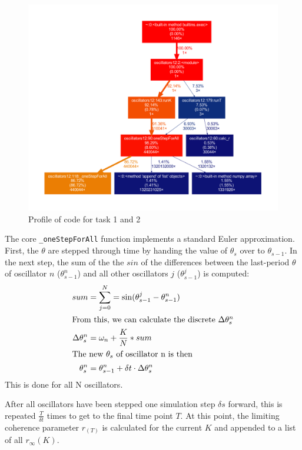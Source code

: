 \documentclass[11pt,a4paper]{article}
\newcommand{\graph}{\medskip\noindent}
\newcommand{\code}[1]{\texttt{#1}}
\begin{document}
\begin{figure}[h]
	\centering
	\includegraphics[width=\textwidth]{graphics/profile12a.pdf}
	\caption{Profile of code for task 1 and 2}
	\label{profile12}
\end{figure}

\graph
The core \code{\_oneStepForAll} function implements a standard Euler approximation.
First, the $\theta$ are stepped through time by handing the value of $\theta_{s}$ over to $\theta_{s-1}$.
In the next step, the sum of the the $sin$ of the differences between the last-period $\theta$ of oscillator $n$ ($\theta_{s-1}^n$) and all other oscillators $j$ ($\theta_{s-1}^j$) is computed:
\begin{align*}
	sum 					& = \sum_{j = 0}^N = \sin(\theta^j_{s-1} - \theta^n_{s-1}) \\
\intertext{From this, we can calculate the discrete $\Delta\theta_s^n$}
	\Delta\theta_s^n 		& = \omega_n + \frac{K}{N} *  sum \\
\intertext{The new $\theta_s$ of oscillator n is then}
	\theta^n_s 				& = \theta^n_{s-1} + \delta t \cdot \Delta\theta_s^n 
\end{align*}
This is done for all N oscillators. 




\graph
After all oscillators have been stepped one simulation step $\delta s$ forward, this is repeated $\frac{T}{\delta t}$ times to get to the final time point $T$.
At this point, the limiting coherence parameter $r_(T)$ is calculated for the current $K$ and appended to a list of all $r_\infty(K)$. 
\end{document}
